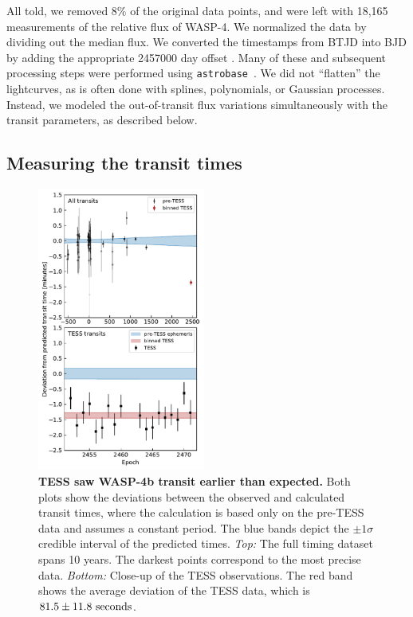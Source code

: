 \documentclass[12pt,twocolumn,tighten]{aastex62}
\begin{document}
All told, we removed 8\% of the original data points, and were left
with 18{,}165 measurements of the relative flux of WASP-4.  We
normalized the data by dividing out the median flux.  We converted the
timestamps from BTJD into BJD by adding the appropriate 2457000 day
offset \citep{tess_data_product_description_2018}.  Many of these and
subsequent processing steps were performed using
\texttt{astrobase}~\citep{bhatti_astrobase_2018}. We did not
``flatten'' the lightcurves, as is often done with splines,
polynomials, or Gaussian processes.  Instead, we modeled the
out-of-transit flux variations simultaneously with the transit parameters,
as described below.

\subsection{Measuring the transit times}
\label{sec:measurement}

\begin{figure}[t!]
    \begin{center}
        \leavevmode
        \includegraphics[width=0.49\textwidth]{f3.pdf}
    \end{center}
    \vspace{-0.6cm}
    \caption{ {\bf TESS saw WASP-4b transit earlier than expected.}
      Both plots show the deviations between the observed and
      calculated transit times, where the calculation is based only on
      the pre-TESS data and assumes a constant period.  The blue bands
      depict the $\pm$$1\sigma$ credible interval of the predicted
      times.  {\it Top:} The full timing dataset spans 10 years. The
      darkest points correspond to the most precise data.  {\it
        Bottom:} Close-up of the TESS observations. The red band shows
      the average deviation of the TESS data, which is $81.5 \pm
      11.8\ {\rm seconds}$.
        \label{fig:arrived_early}
    }
\end{figure}
\end{document}
